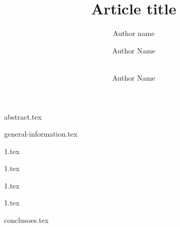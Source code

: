 \documentclass[12pt]{article}
\title{Article title}
\author{Author name\inst{1} \and Author Name\inst{2} \and \\
 Author Name\inst{3} }
\begin{document}
 

  \maketitle


  {abstract.tex}


  {general-information.tex}


  {1.tex}


  {1.tex}


  {1.tex}


  {1.tex}


  {conclusoes.tex}


  
  
  
\end{document}
